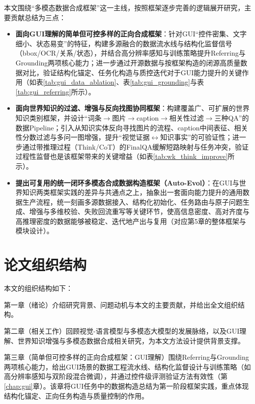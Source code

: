 本文围绕“多模态数据合成框架”这一主线，按照框架逐步完善的逻辑展开研究，主要贡献总结为三点：
\begin{itemize}
  \item \textbf{面向GUI理解的简单但可控多样的正向合成框架}：针对GUI“控件密集、文字细小、状态易变”的特征，构建多源融合的数据流水线与结构化监督信号（bbox/OCR/关系/状态），并结合高分辨率感知与训练策略提升Referring与Grounding两项核心能力；进一步通过开源数据与按框架构造的闭源高质量数据对比，验证结构化锚定、任务化构造与质控迭代对于GUI能力提升的关键作用（如表\ref{tab:gui_data_ablation}、表\ref{tab:gui_grounding}与表\ref{tab:gui_referring}所示）。
  \item \textbf{面向世界知识的过滤、增强与反向找图协同框架}：构建覆盖广、可扩展的世界知识类别框架，并设计“词条$\rightarrow$图片$\rightarrow$caption$\rightarrow$相关性过滤$\rightarrow$三种QA”的数据Pipeline；引入从知识实体反向寻找图片的流程、caption中间表征、相关性分数过滤与多问一图增强，提升“视觉证据$\leftrightarrow$知识事实”的可验证性；进一步通过带推理过程（Think/CoT）的FinalQA缓解短路映射与任务冲突，验证过程性监督也是该框架带来的关键增益（如表\ref{tab:wk_think_improve}所示）。
  \item \textbf{提出可复用的统一闭环多模态合成数据构造框架（Auto-Evol）}：在GUI与世界知识两类框架实践的差异与共通点之上，抽象出一套面向能力提升的通用数据生产流程，统一刻画多源数据接入、结构化初始化、任务路由与原子问题生成、增强与多维校验、失败回流重写等关键环节，使高信息密度、高对齐度与高推理密度的数据能够被稳定、迭代地产出与复用（对应第5章的整体框架与模块设计）。
\end{itemize}

\section{论文组织结构}

本文的组织结构如下：

第一章（绪论）介绍研究背景、问题动机与本文的主要贡献，并给出全文组织结构。

第二章（相关工作）回顾视觉-语言模型与多模态大模型的发展脉络，以及GUI理解、世界知识增强与多模态数据合成相关研究，为本文方法设计提供背景支撑。

第三章（简单但可控多样的正向合成框架：GUI理解）围绕Referring与Grounding两项核心能力，给出GUI场景的数据工程流水线、结构化监督设计与训练策略（如高分辨率感知与双阶段混合微调），并通过控件级评测验证方法有效性（第\ref{chap:gui}章）。该章将GUI任务中的数据构造总结为第一阶段框架实践，重点体现结构化锚定、正向任务构造与质量控制的作用。

